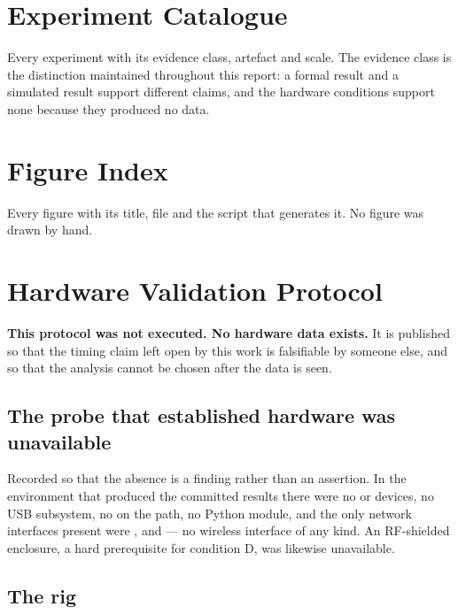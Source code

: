 \chapter{Experiment Catalogue}\label{app:experiments}

Every experiment with its evidence class, artefact and scale. The evidence class is the
distinction maintained throughout this report: a formal result and a simulated result support
different claims, and the hardware conditions support none because they produced no data.



\chapter{Figure Index}\label{app:figures}

Every figure with its title, file and the script that generates it. No figure was drawn by hand.



\chapter{Hardware Validation Protocol}\label{app:hardware}

\textbf{This protocol was not executed. No hardware data exists.} It is published so that the
timing claim left open by this work is falsifiable by someone else, and so that the analysis
cannot be chosen after the data is seen.

\section{The probe that established hardware was unavailable}

Recorded so that the absence is a finding rather than an assertion. In the environment that
produced the committed results there were no  or  devices,
no USB subsystem, no  on the path, no Python  module, and the only
network interfaces present were ,  and  --- no wireless interface
of any kind. An RF-shielded enclosure, a hard prerequisite for condition D, was likewise
unavailable.

\section{The rig}


